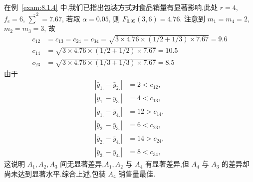 \begin{example}\label{exam:8.2.3}
  在例~\ref{exam:8.1.4} 中,我们已指出包装方式对食品销量有显著影响,此处 $r=4$, $f_e = 6$, $\hat{\sum}^2 = 7.67$, 若取 $\alpha = 0.05$, 则 $F_{0.95}(3,6) = 4.76$. 注意到 $m_1 = m_4 = 2$, $m_2=m_3=3$, 故
  \begin{align*} 
    c_{12} &=c_{13}=c_{24}=c_{34}=\sqrt{3 \times 4.76 \times(1 / 2+1 / 3) \times 7.67}=9.6 \\ 
    c_{14} &=\sqrt{3 \times 4.76 \times(1 / 2+1 / 2) \times 7.67}=10.5 \\ 
    c_{23} &=\sqrt{3 \times 4.76 \times(1 / 3+1 / 3) \times 7.67}=8.5 
  \end{align*}
  由于
  \begin{align*}
    \left|\bar{y}_{1.}-\bar{y}_{2.} \right| &=  2 < c_{12},\\
    \left|\bar{y}_{1.}-\bar{y}_{3.} \right| &=  4 < c_{13},\\
    \left|\bar{y}_{1.}-\bar{y}_{4.} \right| &= 12 > c_{14},\\
    \left|\bar{y}_{2.}-\bar{y}_{3.} \right| &=  6 < c_{23},\\
    \left|\bar{y}_{2.}-\bar{y}_{4.} \right| &= 14 > c_{24},\\
    \left|\bar{y}_{3.}-\bar{y}_{4.} \right| &=  8 < c_{34},   
  \end{align*}
这说明 $A_1, A_2, A_3$ 间无显著差异,$A_1, A_2$ 与 $A_4$ 有显著差异,但 $A_4$ 与 $A_3$ 的差异却尚未达到显著水平.综合上述,包装 $A_4$ 销售量最佳.
\end{example}

